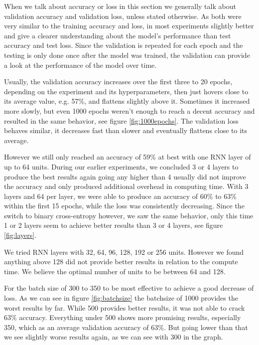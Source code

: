 \documentclass[
	ngerman,
	ruledheaders=section,%
	class=report,%
	thesis={type=bachelor},%
	accentcolor=9c,%
	custommargins=true,%
	marginpar=false,%
	parskip=half-,%
	fontsize=11pt,%
]{tudapub}
\begin{document}
When we talk about accuracy or loss in this section we generally talk about validation accuracy and validation loss, unless stated otherwise.
As both were very similar to the training accuracy and loss, in most experiments slightly better and give a clearer understanding about the model's performance than test accuracy and test loss.
Since the validation is repeated for each epoch and the testing is only done once after the model was trained, the validation can provide a look at the performance of the model over time.

Usually, the validation accuracy increases over the first three to 20 epochs, depending on the experiment and its hyperparameters, then just hovers close to its average value, e.g. 57\%, and flattens slightly above it.
Sometimes it increased more slowly, but even 1000 epochs weren't enough to reach a decent accuracy and resulted in the same behavior, see figure \ref{fig:1000epochs}.
The validation loss behaves similar, it decreases fast than slower and eventually flattens close to its average.

However we still only reached an accuracy of 59\% at best with one RNN layer of up to 64 units.
During our earlier experiments, we concluded 3 or 4 layers to produce the best results again going any higher than 4 usually did not improve the accuracy and only produced additional overhead in computing time.
With 3 layers and 64 per layer, we were able to produce an accuracy of 60\% to 63\% within the first 15 epochs, while the loss was consistently decreasing.
Since the switch to binary cross-entropy however, we saw the same behavior, only this time 1 or 2 layers seem to achieve better results than 3 or 4 layers, see figure \ref{fig:layers}.

We tried RNN layers with 32, 64, 96, 128, 192 or 256 units.
However we found anything above 128 did not provide better results in relation to the compute time.
We believe the optimal number of units to be between 64 and 128.

For the batch size of 300 to 350 to be most effective to achieve a good decrease of loss.
As we can see in figure \ref{fig:batchsize} the batchsize of 1000 provides the worst results by far.
While 500 provides better results, it was not able to crack 63\% accuracy.
Everything under 500 shows more promising results, especially 350, which as an average validation accuracy of 63\%.
But going lower than that we see slightly worse results again, as we can see with 300 in the graph.
\end{document}
